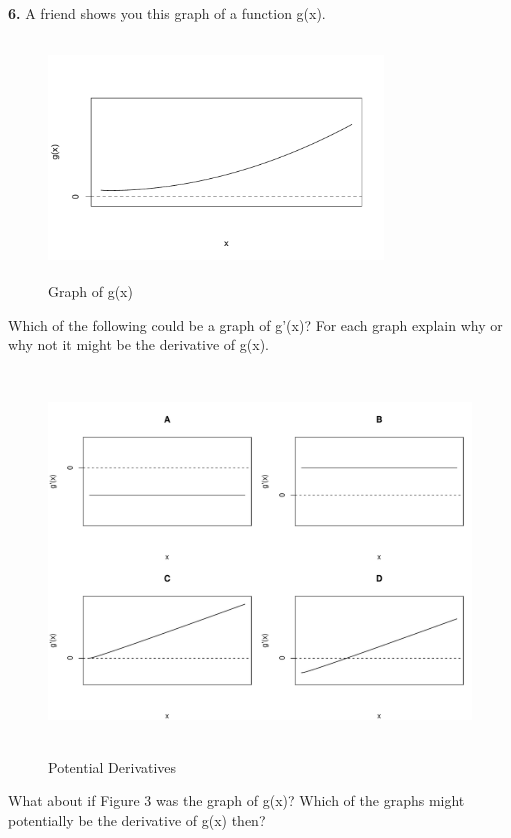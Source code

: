\documentclass[12pt]{article}
\begin{document}
\pagebreak

\noindent \textbf{6.} A friend shows you this graph of a function g(x). 

\begin{figure}[!ht]
\centering
\caption{Graph of g(x)}
\includegraphics[height=2.5in, width=3.5in]{function1.pdf}
\end{figure}


Which of the following could be a graph of g'(x)? For each graph explain why or why not it might be the derivative of g(x). 

\begin{figure}[!ht]
\centering
\caption{Potential Derivatives}
\includegraphics[height=4in, width=6in]{examples.pdf}
\end{figure}

\pagebreak

What about if Figure 3 was the graph of g(x)? Which of the graphs might potentially be the derivative of g(x) then?
\end{document}
